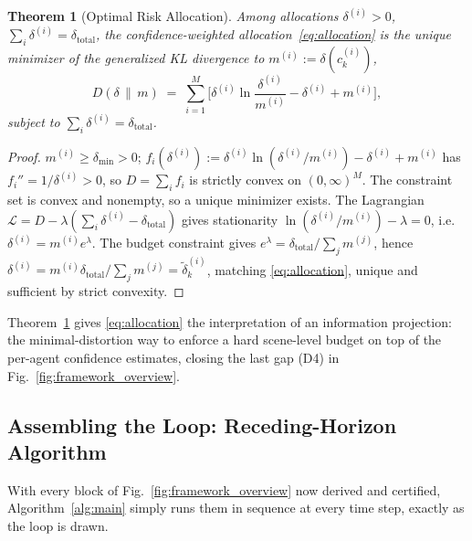 \documentclass[letterpaper, 10 pt, conference]{ieeeconf}
\newtheorem{theorem}{Theorem}
\begin{document}
\begin{theorem}[Optimal Risk Allocation]
\label{thm:optimal-allocation}
Among allocations $\delta^{(i)}> 0$, $\sum_i\delta^{(i)}=\delta_{\mathrm{total}}$, the confidence-weighted allocation~\eqref{eq:allocation} is the unique minimizer of the generalized KL divergence to $m^{(i)}:=\delta(c_k^{(i)})$,
\begin{equation}
D(\delta\,\|\,m) \;=\; \sum_{i=1}^M \Big[\delta^{(i)}\ln\frac{\delta^{(i)}}{m^{(i)}} - \delta^{(i)} + m^{(i)}\Big], \label{eq:kl}
\end{equation}
subject to $\sum_i\delta^{(i)}=\delta_{\mathrm{total}}$.
\end{theorem}
\begin{proof}
$m^{(i)}\ge\delta_{\min}>0$; $f_i(\delta^{(i)}):=\delta^{(i)}\ln(\delta^{(i)}/m^{(i)})-\delta^{(i)}+m^{(i)}$ has $f_i''=1/\delta^{(i)}>0$, so $D=\sum_i f_i$ is strictly convex on $(0,\infty)^M$. The constraint set is convex and nonempty, so a unique minimizer exists. The Lagrangian $\mathcal L=D-\lambda(\sum_i\delta^{(i)}-\delta_{\mathrm{total}})$ gives stationarity $\ln(\delta^{(i)}/m^{(i)})-\lambda=0$, i.e.\ $\delta^{(i)}=m^{(i)}e^{\lambda}$. The budget constraint gives $e^{\lambda}=\delta_{\mathrm{total}}/\sum_j m^{(j)}$, hence $\delta^{(i)}=m^{(i)}\delta_{\mathrm{total}}/\sum_j m^{(j)}=\tilde\delta_k^{(i)}$, matching \eqref{eq:allocation}, unique and sufficient by strict convexity.
\end{proof}

Theorem~\ref{thm:optimal-allocation} gives \eqref{eq:allocation} the interpretation of an information projection: the minimal-distortion way to enforce a hard scene-level budget on top of the per-agent confidence estimates, closing the last gap (D4) in Fig.~\ref{fig:framework_overview}.

\subsection{Assembling the Loop: Receding-Horizon Algorithm}
\label{sec:alg}

With every block of Fig.~\ref{fig:framework_overview} now derived and certified, Algorithm~\ref{alg:main} simply runs them in sequence at every time step, exactly as the loop is drawn.
\end{document}

